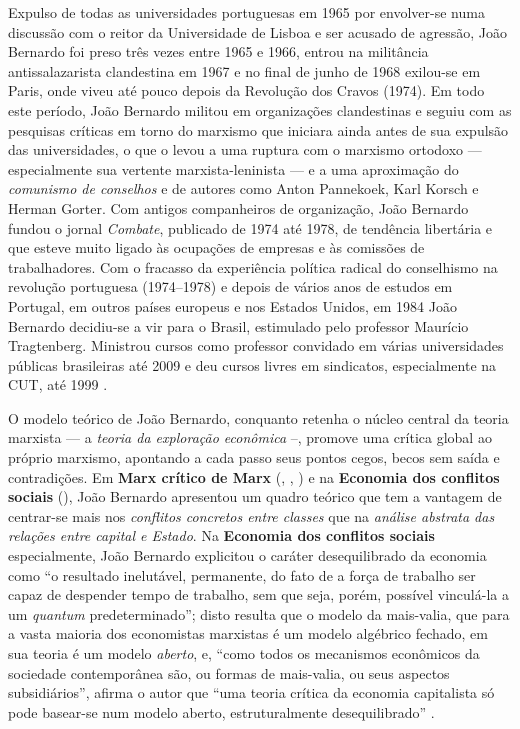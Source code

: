Expulso de todas as universidades portuguesas em 1965 por envolver-se numa discussão com o reitor da Universidade de Lisboa e ser acusado de agressão, João Bernardo foi preso três vezes entre 1965 e 1966, entrou na militância antissalazarista clandestina em 1967 e no final de junho de 1968 exilou-se em Paris, onde viveu até pouco depois da Revolução dos Cravos (1974). Em todo este período, João Bernardo militou em organizações clandestinas e seguiu com as pesquisas críticas em torno do marxismo que iniciara ainda antes de sua expulsão das universidades, o que o levou a uma ruptura com o marxismo ortodoxo --- especialmente sua vertente marxista-leninista --- e a uma aproximação do \textit{comunismo de conselhos} e de autores como Anton Pannekoek, Karl Korsch e Herman Gorter. Com antigos companheiros de organização, João Bernardo fundou o jornal \textit{Combate}, publicado de 1974 até 1978, de tendência libertária e que esteve muito ligado às ocupações de empresas e às comissões de trabalhadores. Com o fracasso da experiência política radical do conselhismo na revolução portuguesa (1974–1978) e depois de vários anos de estudos em Portugal, em outros países europeus e nos Estados Unidos, em 1984 João Bernardo decidiu-se a vir para o Brasil, estimulado pelo professor Maurício Tragtenberg. Ministrou cursos como professor convidado em várias universidades públicas brasileiras até 2009 e deu cursos livres em sindicatos, especialmente na CUT, até 1999 \cite{BERNARDO2014}.

O modelo teórico de João Bernardo, conquanto retenha o núcleo central da teoria marxista --- a \textit{teoria da exploração econômica} --, promove uma crítica global ao próprio marxismo, apontando a cada passo seus pontos cegos, becos sem saída e contradições. Em \textbf{Marx crítico de Marx} (\citeyear{BERNARDO1977a}, \citeyear{BERNARDO1977b}, \citeyear{BERNARDO1977c}) e na \textbf{Economia dos conflitos sociais} (\citeyear{BERNARDO1991}), João Bernardo apresentou um quadro teórico que tem a vantagem de centrar-se mais nos \textit{conflitos concretos entre classes} que na \textit{análise abstrata das relações entre capital e Estado}. Na \textbf{Economia dos conflitos sociais} especialmente, João Bernardo explicitou o caráter desequilibrado da economia como ``o resultado inelutável, permanente, do fato de a força de trabalho ser capaz de despender tempo de trabalho, sem que seja, porém, possível vinculá-la a um \textit{quantum} predeterminado''; disto resulta que o modelo da mais-valia, que para a vasta maioria dos economistas marxistas é um modelo algébrico fechado, em sua teoria é um modelo \textit{aberto}, e, ``como todos os mecanismos econômicos da sociedade contemporânea são, ou formas de mais-valia, ou seus aspectos subsidiários'', afirma o autor que ``uma teoria crítica da economia capitalista só pode basear-se num modelo aberto, estruturalmente desequilibrado'' \cite[p.~62]{BERNARDO1991}. 

